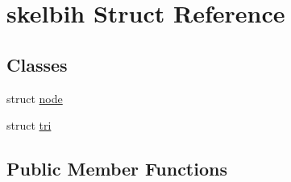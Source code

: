 \hypertarget{structskelbih}{}\section{skelbih Struct Reference}
\label{structskelbih}
\subsection*{Classes}
\begin{DoxyCompactItemize}
\item 
struct \hyperlink{structskelbih_1_1node}{node}
\item 
struct \hyperlink{structskelbih_1_1tri}{tri}
\end{DoxyCompactItemize}
\subsection*{Public Member Functions}
